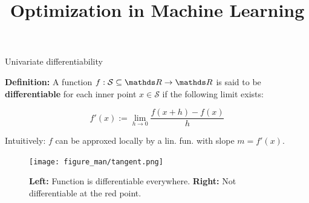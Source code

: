 \documentclass[11pt,compress,t,notes=noshow, xcolor=table]{beamer}
\title{Optimization in Machine Learning}
\date{}
\begin{document}
\lecture{\inserttitle}
\sloppy



\begin{vbframe}{Univariate differentiability}

\textbf{Definition:} A function $f: \mathcal{S} \subseteq \R \to \R$ is said to be \textbf{differentiable} for each inner point $x \in \mathcal{S}$ if the following limit exists:

$$
f'(x) := \lim_{h \to 0} \frac{f(x + h) - f(x)}{h}
$$

Intuitively: $f$ can be approxed locally by a lin. fun. with slope $m = f'(x)$. 

\begin{figure}
    \centering
    \texttt{[image: figure\_man/tangent.png]}
    \caption*{\footnotesize \textbf{Left:} Function is differentiable everywhere.
        \textbf{Right:} Not differentiable at the red point. }
\end{figure}








\end{vbframe}
\end{document}
